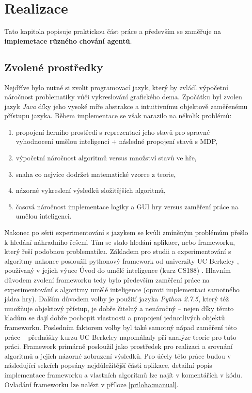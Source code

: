 \chapter{Realizace}
Tato kapitola popisuje praktickou část práce a především se zaměřuje na \textbf{implemetace různého chování agentů}.

\section{Zvolené prostředky}
Nejdříve bylo nutné si zvolit programovací jazyk, který by zvládl výpočetní náročnost problematiky vůči vykreslování grafického dema. Zpočátku byl zvolen jazyk \textit{Java} díky jeho vysoké míře abstrakce a intuitivnímu objektově zaměřenému přístupu jazyka. Během implementace se však narazilo na několik problémů: 
\begin{enumerate}
\item propojení herního prostředí s reprezentací jeho stavů pro spravné vyhodnocení umělou inteligencí + následné propojení stavů s MDP,
\item výpočetní náročnost algoritmů versus množství stavů ve hře,
\item snaha co nejvíce dodržet matematické vzorce z teorie,
\item názorné vykreslení výsledků složitějších algoritmů,
\item časová náročnost implementace logiky a GUI hry versus zaměření práce na umělou inteligenci.
\end{enumerate}
Nakonec po sérii experimentování s jazykem se kvůli zmíněným problémům přešlo k hledání náhradního řešení. Tím se stalo hledání aplikace, nebo frameworku, který řeší podobnou problematiku. Základem pro studii a experimentování s algoritmy nakonec posloužil pythonový framework od univerzity UC Berkeley \cite{pacmanProjects}, používaný v jejich výuce Úvod do umělé inteligence (kurz CS188) \cite{berkeley}. Hlavním důvodem zvolení frameworku tedy bylo především zaměření práce na experimentování s algoritmy umělé inteligence (oproti implementaci samotného jádra hry). Dalším důvodem volby je použití jazyka \textit{Python 2.7.5}, který též umožňuje objektový přístup, je dobře čitelný a nenáročný -- nejen díky těmto kladům se dají dobře pochopit vlastnosti a propojení jednotlivých objektů frameworku. Posledním faktorem volby byl také samotný nápad zaměření této práce -- přednášky kurzu UC Berkeley napomáhaly při analýze teorie pro tuto práci. Framework primárně posloužil jako prostředek pro realizaci a srovnání algoritmů a jejich názorné zobrazení výsledků.
Pro účely této práce budou v následující sekcích popsány nejdůležitější části aplikace, detailní popis implementace frameworku a vlastních algoritmů lze najít v komentářích v kódu. Ovladání frameworku lze nalézt v příloze \ref{priloha:manual}.

